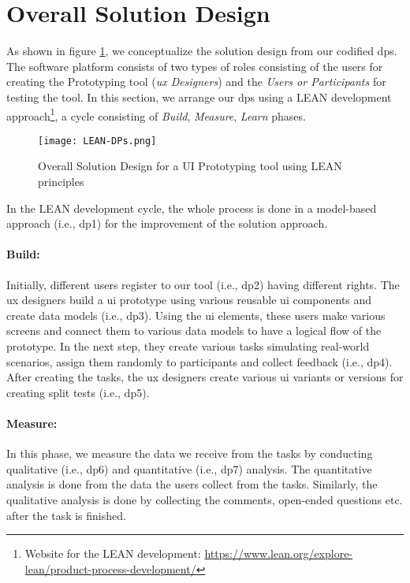 \clearpage
\section{Overall Solution Design}
\label{design:section:solutiondesign}
As shown in figure \ref{fig:design:lean}, we conceptualize the solution design from our codified \ac{dp}s.
The software platform consists of two types of roles consisting of the users for creating the Prototyping tool (\textit{\ac{ux} Designers}) and the \textit{Users or Participants} for testing the tool.
In this section, we arrange our \ac{dp}s using a LEAN development approach\footnote{Website for the LEAN development: \url{https://www.lean.org/explore-lean/product-process-development/}}, a cycle consisting of \textit{Build}, \textit{Measure}, \textit{Learn} phases.

\begin{figure}[htbp!]
  \centering    
  \texttt{[image: LEAN-DPs.png]}
  \caption[Solution Concept]{Overall Solution Design for a UI Prototyping tool using LEAN principles\footnotemark[10]}
  \label{fig:design:lean}
\end{figure}

In the LEAN development cycle, the whole process is done in a model-based approach (i.e., \ac{dp}1) for the improvement of the solution approach.
\paragraph{Build:}
\label{design:paragraph:build}
Initially, different users register to our tool (i.e., \ac{dp}2) having different rights. 
The \ac{ux} designers build a \ac{ui} prototype using various reusable \ac{ui} components and create data models (i.e., \ac{dp}3). 
Using the \ac{ui} elements, these users make various screens and connect them to various data models to have a logical flow of the prototype.
In the next step, they create various tasks simulating real-world scenarios, assign them randomly to participants and collect feedback (i.e., \ac{dp}4).
After creating the tasks, the \ac{ux} designers create various \ac{ui} variants or versions for creating split tests (i.e., \ac{dp}5).

\paragraph{Measure:}
\label{design:paragraph:measure}
In this phase, we measure the data we receive from the tasks by conducting qualitative (i.e., \ac{dp}6) and quantitative (i.e., \ac{dp}7) analysis.
The quantitative analysis is done from the data the users collect from the tasks.
Similarly, the qualitative analysis is done by collecting the comments, open-ended questions etc. after the task is finished. 
